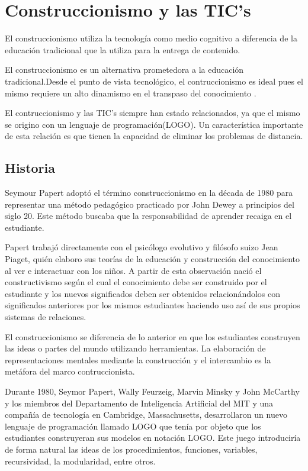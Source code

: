 \section{Construccionismo y las TIC's}

El construccionismo utiliza la tecnología como medio cognitivo  a diferencia de la educación tradicional que la utiliza para la entrega de contenido. 

El construccionismo es un alternativa prometedora a la educación tradicional.Desde el punto de vista tecnológico, el contruccionismo es ideal pues el mismo requiere un alto dinamismo en el transpaso del conocimiento \cite{sasha:construtivism}. 

El contruccionismo y las TIC's siempre han estado relacionados, ya que el mismo se origino con un lenguaje de programación(LOGO)\cite{ict:ttc}. Un característica importante de esta relación es que tienen la capacidad de eliminar los problemas de distancia\cite{mariluz:seiousgames}.


\subsection{Historia}

Seymour Papert adoptó el término construccionismo en la década de 1980 para representar una método pedagógico practicado por John Dewey a principios del siglo 20. Este método buscaba que la responsabilidad de aprender recaiga en el estudiante. 

Papert trabajó directamente con el psicólogo evolutivo y filósofo suizo Jean Piaget, quién elaboro sus teorías de la educación y construcción del conocimiento al ver e interactuar con los niños. A partir de esta observación nació el constructivismo según el cual el conocimiento debe ser construido por el estudiante y los nuevos significados deben ser obtenidos relacionándolos con significados anteriores por los mismos estudiantes haciendo uso así de sus propios sistemas de relaciones.

El construccionismo se diferencia de lo anterior en que los estudiantes construyen las ideas o partes del mundo utilizando herramientas. La elaboración de representaciones mentales mediante la construcción y el intercambio es la metáfora del marco contruccionista. 

Durante 1980, Seymor Papert, Wally Feurzeig, Marvin Minsky y John McCarthy y los miembros del Departamento de Inteligencia Artificial del MIT y una compañía de tecnología en Cambridge, Massachusetts, desarrollaron un nuevo lenguaje de programación llamado LOGO que tenía por objeto que los estudiantes construyeran sus modelos en notación LOGO. Este juego introduciría de forma natural las ideas de los procedimientos, funciones, variables, recursividad, la modularidad, entre otros.

